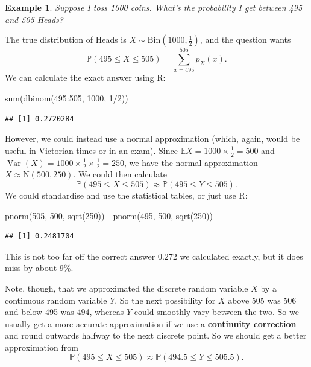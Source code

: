 \documentclass[
  a4paper,
]{book}
\newenvironment{Shaded}{\begin{snugshade}}{\end{snugshade}}
\newcommand{\DecValTok}[1]{\textcolor[rgb]{0.00,0.00,0.81}{#1}}
\newcommand{\FunctionTok}[1]{\textcolor[rgb]{0.00,0.00,0.00}{#1}}
\newcommand{\NormalTok}[1]{#1}
\newcommand{\SpecialCharTok}[1]{\textcolor[rgb]{0.00,0.00,0.00}{#1}}
\theoremstyle{definition}
\theoremstyle{definition}
\newtheorem{example}{Example}[chapter]
\theoremstyle{definition}
\theoremstyle{definition}
\theoremstyle{remark}
\begin{document}
\begin{example}
\emph{Suppose I toss 1000 coins. What's the probability I get between 495 and 505 Heads?}

The true distribution of Heads is \(X \sim \mathrm{Bin}(1000, \frac12)\), and the question wants
\[ \mathbb P(495 \leq X \leq 505) = \sum_{x = 495}^505 p_X(x) . \]
We can calculate the exact answer using R:

\begin{Shaded}
\begin{Highlighting}[]
\FunctionTok{sum}\NormalTok{(}\FunctionTok{dbinom}\NormalTok{(}\DecValTok{495}\SpecialCharTok{:}\DecValTok{505}\NormalTok{, }\DecValTok{1000}\NormalTok{, }\DecValTok{1}\SpecialCharTok{/}\DecValTok{2}\NormalTok{))}
\end{Highlighting}
\end{Shaded}

\begin{verbatim}
## [1] 0.2720284
\end{verbatim}

However, we could instead use a normal approximation (which, again, would be useful in Victorian times or in an exam). Since \(\mathbb EX = 1000 \times \frac12 = 500\) and \(\operatorname{Var}(X) = 1000 \times \frac12 \times \frac12 = 250\), we have the normal approximation \(X \approx \mathrm N(500, 250)\). We could then calculate
\[ \mathbb P(495 \leq X \leq 505) \approx \mathbb P(495 \leq Y \leq 505) . \]
We could standardise and use the statistical tables, or just use R:

\begin{Shaded}
\begin{Highlighting}[]
\FunctionTok{pnorm}\NormalTok{(}\DecValTok{505}\NormalTok{, }\DecValTok{500}\NormalTok{, }\FunctionTok{sqrt}\NormalTok{(}\DecValTok{250}\NormalTok{)) }\SpecialCharTok{{-}} \FunctionTok{pnorm}\NormalTok{(}\DecValTok{495}\NormalTok{, }\DecValTok{500}\NormalTok{, }\FunctionTok{sqrt}\NormalTok{(}\DecValTok{250}\NormalTok{))}
\end{Highlighting}
\end{Shaded}

\begin{verbatim}
## [1] 0.2481704
\end{verbatim}

This is not too far off the correct answer \(0.272\) we calculated exactly, but it does miss by about 9\%.

Note, though, that we approximated the discrete random variable \(X\) by a continuous random variable \(Y\). So the next possibility for \(X\) above 505 was 506 and below 495 was 494, whereas \(Y\) could smoothly vary between the two. So we usually get a more accurate approximation if we use a \textbf{continuity correction} and round outwards halfway to the next discrete point. So we should get a better approximation from
\[ \mathbb P(495 \leq X \leq 505) \approx \mathbb P(494.5 \leq Y \leq 505.5) . \]


\end{example}
\end{document}

